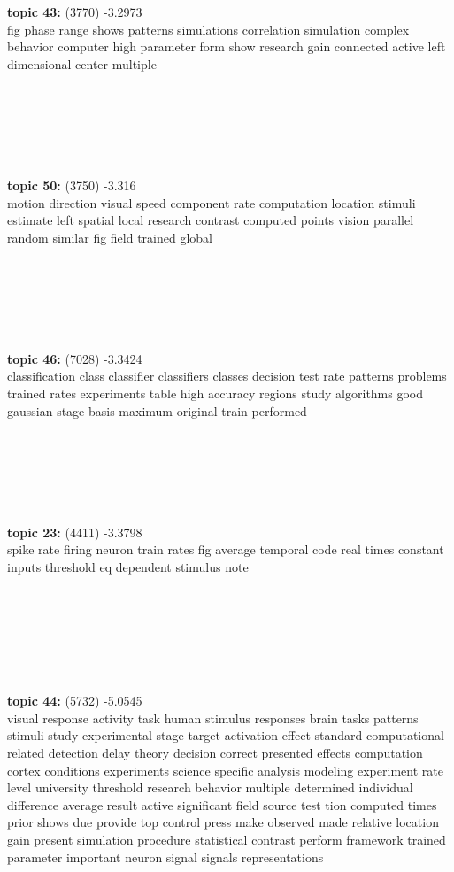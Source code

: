 \documentclass{article}
\begin{document}
\begin{spacing}{1.1}
\begin{table}[ht]
\begin{minipage}[b]{0.5\linewidth}
{\bf topic 43:} (3770)  -3.2973\\
fig phase range shows patterns simulations correlation simulation complex behavior computer high parameter form show research gain connected active left dimensional center multiple \\\\\\\\\\\\\\
{\bf topic 50:} (3750)  -3.316\\
motion direction visual speed component rate computation location stimuli estimate left spatial local research contrast computed points vision parallel random similar fig field trained global \\\\\\\\\\\\\\
{\bf topic 46:} (7028)  -3.3424\\
classification class classifier classifiers classes decision test rate patterns problems trained rates experiments table high accuracy regions study algorithms good gaussian stage basis maximum original train performed \\\\\\\\\\\\\\
{\bf topic 23:} (4411)  -3.3798\\
spike rate firing neuron train rates fig average temporal code real times constant inputs threshold eq dependent stimulus note \\\\\\\\\\\\\\
\end{minipage}
\hspace{0.5cm}
\begin{minipage}[b]{0.5\linewidth}
\begin{center}
{\bf topic 44:} (5732) -5.0545\\
visual response activity task human stimulus responses brain tasks patterns stimuli study experimental stage target activation effect standard computational related detection delay theory decision correct presented effects computation cortex conditions experiments science specific analysis modeling experiment rate level university threshold research behavior multiple determined individual difference average result active significant field source test tion computed times prior shows due provide top control press make observed made relative location gain present simulation procedure statistical contrast perform framework trained parameter important neuron signal signals representations \\

\end{center}
\end{minipage}
\end{table}
\end{spacing}
\end{document}
